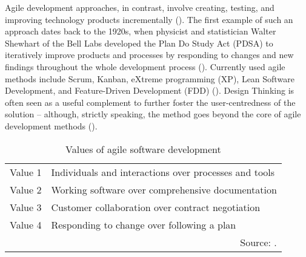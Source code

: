 Agile development approaches, in contrast, involve creating, testing, and improving technology products incrementally (\cite{Mergel2016}). The first example of such an approach dates back to the 1920s, when physicist and statistician Walter Shewhart of the Bell Labs developed the Plan Do Study Act (PDSA) to iteratively improve products and processes by responding to changes and new findings throughout the whole development process (\cite{Goldman1994}). Currently used agile methods include Scrum, Kanban, eXtreme programming (XP), Lean Software Development, and Feature-Driven Development (FDD) (\cite{Dingsoyr2012, Rigby2016a}). Design Thinking is often seen as a useful complement to further foster the user-centredness of the solution – although, strictly speaking, the method goes beyond the core of agile development methods (\cite{DaSilva2011, AustralianDigitalTransformationAgency2019}).

\begin{table}[ht!]
	\centering
	\begin{spacing}{.8}
	\caption{Values of agile software development}\label{tab: Values of agile software development}
	\renewcommand{\arraystretch}{1.4}
	\begin{tabular}{ p{1.5cm} p{9.5cm} }
		\hline
		Value 1 & Individuals and interactions over processes and tools\\
		Value 2 & Working software over comprehensive documentation\\
		Value 3 & Customer collaboration over contract negotiation\\
		Value 4 & Responding to change over following a plan\\
		\hline
		\multicolumn{2}{r}{Source: \cite{AgileManifesto2001}.}	
	\end{tabular}
    \end{spacing}
\end{table}

